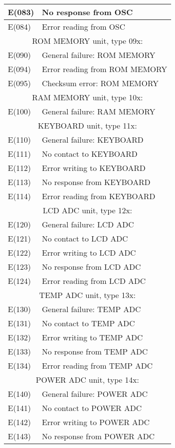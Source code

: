 \begin{longtable}{|l|l|}
E(083)& No response from OSC\\ \hline
E(084)& Error reading from OSC\\ \hline
\multicolumn{2}{|c|}{ROM MEMORY unit, type 09x:}\\ \hline
E(090)& General failure: ROM MEMORY\\ \hline
E(094)& Error reading from ROM MEMORY\\ \hline
E(095)& Checksum error: ROM MEMORY\\ \hline
\multicolumn{2}{|c|}{RAM MEMORY unit, type 10x:}\\ \hline
E(100)& General failure: RAM MEMORY\\ \hline
\multicolumn{2}{|c|}{KEYBOARD unit, type 11x:}\\ \hline
E(110)& General failure: KEYBOARD\\ \hline
E(111)& No contact to KEYBOARD\\ \hline
E(112)& Error writing to KEYBOARD\\ \hline
E(113)& No response from KEYBOARD\\ \hline
E(114)& Error reading from KEYBOARD\\ \hline
\multicolumn{2}{|c|}{LCD ADC unit, type 12x:}\\ \hline
E(120)& General failure: LCD ADC\\ \hline
E(121)& No contact to LCD ADC\\ \hline
E(122)& Error writing to LCD ADC\\ \hline
E(123)& No response from LCD ADC\\ \hline
E(124)& Error reading from LCD ADC\\ \hline
\multicolumn{2}{|c|}{TEMP ADC unit, type 13x:}\\ \hline
E(130)& General failure: TEMP ADC\\ \hline
E(131)& No contact to TEMP ADC\\ \hline
E(132)& Error writing to TEMP ADC\\ \hline
E(133)& No response from TEMP ADC\\ \hline
E(134)& Error reading from TEMP ADC\\ \hline
\multicolumn{2}{|c|}{POWER ADC unit, type 14x:}\\ \hline
E(140)& General failure: POWER ADC\\ \hline
E(141)& No contact to POWER ADC\\ \hline
E(142)& Error writing to POWER ADC\\ \hline
E(143)& No response from POWER ADC\\ \hline

\end{longtable}
